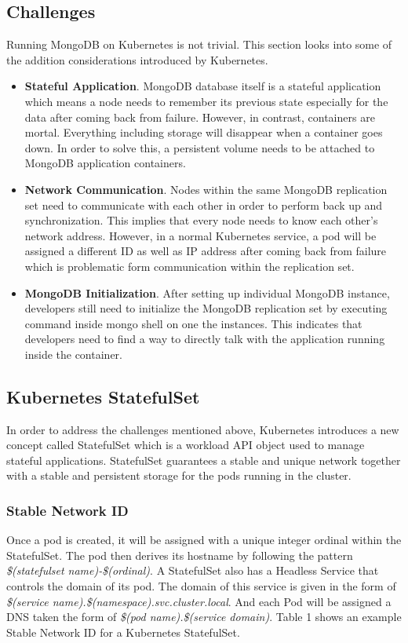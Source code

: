 \documentclass[sigconf]{acmart}
\begin{document}
\subsection{Challenges}
Running MongoDB on Kubernetes is not trivial. This section looks into some of the addition considerations introduced by Kubernetes.
\begin{itemize}
    \item \textbf{Stateful Application}. MongoDB database itself is a stateful application which means a node needs to remember its previous state especially for the data after coming back from failure. However, in contrast, containers are mortal. Everything including storage will disappear when a container goes down. In order to solve this, a persistent volume needs to be attached to MongoDB application containers.  
    \item \textbf{Network Communication}. Nodes within the same MongoDB replication set need to communicate with each other in order to perform back up and synchronization. This implies that every node needs to know each other's network address. However, in a normal Kubernetes service, a pod will be assigned a different ID as well as IP address after coming back from failure which is problematic form communication within the replication set.
    \item \textbf{MongoDB Initialization}. After setting up individual MongoDB instance, developers still need to initialize the MongoDB replication set by executing command inside mongo shell on one the instances. This indicates that developers need to find a way to directly talk with the application running inside the container.
\end{itemize}

\subsection{Kubernetes StatefulSet}
In order to address the challenges mentioned above, Kubernetes introduces a new concept called StatefulSet which is a workload API object used to manage stateful applications. StatefulSet guarantees a stable and unique network together with a stable and persistent storage for the pods running in the cluster.

\subsubsection{Stable Network ID}
Once a pod is created, it will be assigned with a unique integer ordinal within the StatefulSet. The pod then derives its hostname by following the pattern \emph{ \$(statefulset name)-\$(ordinal)}. A StatefulSet also has a Headless Service that controls the domain of its pod. The domain of this service is given in the form of\emph{ \$(service name).\$(namespace).svc.cluster.local}. And each Pod will be assigned a DNS taken the form of \emph{\$(pod name).\$(service domain)}. Table 1 shows an example Stable Network ID for a Kubernetes StatefulSet. 
\end{document}
